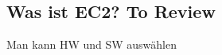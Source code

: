 \subsection{Was ist EC2? To Review}\label{subsec_UabsGrund4}
Man kann HW und SW auswählen




\newpage
